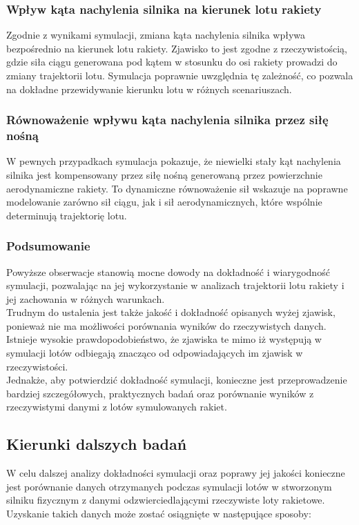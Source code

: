 \subsubsection{Wpływ kąta nachylenia silnika na kierunek lotu rakiety}
Zgodnie z wynikami symulacji, zmiana kąta nachylenia silnika wpływa bezpośrednio na kierunek lotu rakiety. Zjawisko to jest zgodne z rzeczywistością, gdzie siła ciągu generowana pod kątem w stosunku do osi rakiety prowadzi do zmiany trajektorii lotu. Symulacja poprawnie uwzględnia tę zależność, co pozwala na dokładne przewidywanie kierunku lotu w różnych scenariuszach.

\subsubsection{Równoważenie wpływu kąta nachylenia silnika przez siłę nośną}
W pewnych przypadkach symulacja pokazuje, że niewielki stały kąt nachylenia silnika jest kompensowany przez siłę nośną generowaną przez powierzchnie aerodynamiczne rakiety. To dynamiczne równoważenie sił wskazuje na poprawne modelowanie zarówno sił ciągu, jak i sił aerodynamicznych, które wspólnie determinują trajektorię lotu.

\subsubsection{Podsumowanie}
Powyższe obserwacje stanowią mocne dowody na dokładność i wiarygodność
symulacji, pozwalając na jej wykorzystanie w analizach trajektorii lotu
rakiety i jej zachowania w różnych warunkach.
\\Trudnym do ustalenia jest także jakość i dokładność
opisanych wyżej zjawisk, ponieważ nie ma możliwości porównania wyników do
rzeczywistych danych. Istnieje wysokie prawdopodobieństwo, że zjawiska te
mimo iż występują w symulacji lotów odbiegają znacząco od odpowiadających im
zjawisk w rzeczywistości.\\
Jednakże, aby potwierdzić
dokładność symulacji, konieczne jest przeprowadzenie bardziej szczegółowych,
praktycznych badań oraz porównanie wyników z rzeczywistymi danymi z lotów
symulowanych rakiet.

\subsection{Kierunki dalszych badań}

W celu dalszej analizy dokładności symulacji oraz poprawy jej jakości
konieczne jest porównanie danych otrzymanych podczas symulacji lotów w
stworzonym silniku fizycznym z danymi odzwierciedlającymi rzeczywiste loty
rakietowe. Uzyskanie takich danych może zostać osiągnięte w następujące sposoby:

